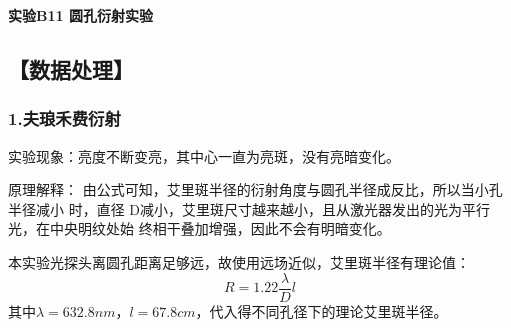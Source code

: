 \documentclass[12pt,a4paper,UTF8]{ctexart}
\begin{document}

\begin{center}
\LARGE\textbf{实验B11 圆孔衍射实验}
\end{center}



\subsection*{【数据处理】}
\subsubsection*{1.夫琅禾费衍射}
实验现象：亮度不断变亮，其中心一直为亮斑，没有亮暗变化。

原理解释： 由公式可知，艾里斑半径的衍射角度与圆孔半径成反比，所以当小孔半径减小
时，直径 D减小，艾里斑尺寸越来越小，且从激光器发出的光为平行光，在中央明纹处始
终相干叠加增强，因此不会有明暗变化。

\begin{table}[htbp]
	\centering
	  \caption{夫琅禾费衍射实验数据}
	\label{tab:1}%
  \end{table}
本实验光探头离圆孔距离足够远，故使用远场近似，艾里斑半径有理论值：
\begin{equation*}
	R=1.22\frac{\lambda}{D}l
\end{equation*}
其中$\lambda=632.8nm$，$l=67.8cm$，代入得不同孔径下的理论艾里斑半径。

  \begin{table}[htbp]
	\centering
	  \caption{艾里斑半径实验值与理论值比较}
	\label{tab:2}%
  \end{table}
\end{document}
